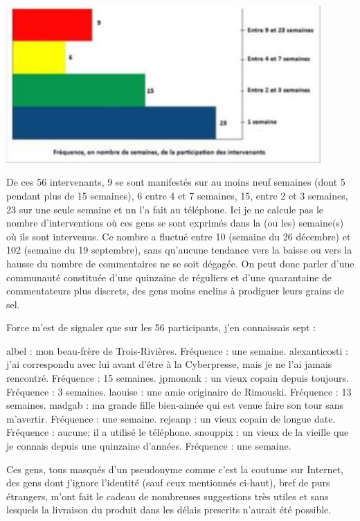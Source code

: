\begin{Postface}
\begin{floatingfigure}[r]{40mm}
\includegraphics[height=60mm]{intro/postface/img/illustration2009021302.jpg}
\end{floatingfigure}

De ces 56 intervenants, 9 se sont manifestés sur au moins neuf semaines (dont 5 pendant plus de 15 semaines), 6 entre 4 et 7 semaines, 15, entre 2 et 3 semaines, 23 sur une seule semaine et un l’a fait au téléphone. Ici je ne calcule pas le nombre d’interventions où ces gens se sont exprimés dans la (ou les) semaine(s) où ils sont intervenus. Ce nombre a fluctué entre 10 (semaine du 26 décembre) et 102 (semaine du 19 septembre), sans qu’aucune tendance vers la baisse ou vers la hausse du nombre de commentaires ne se soit dégagée. On peut donc parler d’une communauté constituée d’une quinzaine de réguliers et d’une quarantaine de commentateurs plus discrets, des gens moins enclins à prodiguer leurs grains de sel.

Force m’est de signaler que sur les 56 participants, j’en connaissais sept :

    albel : mon beau-frère de Trois-Rivières. Fréquence : une semaine.
    alexanticosti : j’ai correspondu avec lui avant d’être à la Cyberpresse, mais je ne l’ai jamais rencontré. Fréquence : 15 semaines.
    jpmononk : un vieux copain depuis toujours. Fréquence : 3 semaines.
    laouise : une amie originaire de Rimouski. Fréquence : 13 semaines.
    madgab : ma grande fille bien-aimée qui est venue faire son tour sans m’avertir. Fréquence : une semaine.
    rejeanp : un vieux copain de longue date. Fréquence : aucune; il a utilisé le téléphone.
    snouppix : un vieux de la vieille que je connais depuis une quinzaine d’années. Fréquence : une semaine.

Ces gens, tous masqués d’un pseudonyme comme c’est la coutume sur Internet, des gens dont j’ignore l’identité (sauf ceux mentionnés ci-haut), bref de purs étrangers, m’ont fait le cadeau de nombreuses suggestions très utiles et sans lesquels la livraison du produit dans les délais prescrits n’aurait été possible.


\end{Postface}
